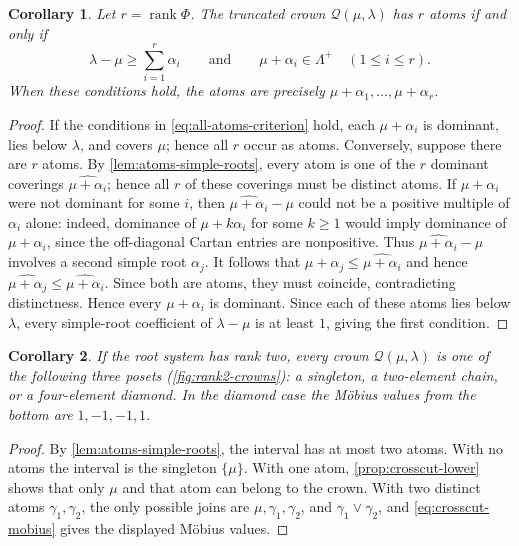 \documentclass[11pt]{article}
\newtheorem{corollary}[corollary]{Corollary}
\theoremstyle{definition}
\theoremstyle{remark}
\newcommand{\Raiz}{\Phi}
\newcommand{\Pesos}{\Lambda}
\newcommand{\QO}{\mathscr{Q}}
\begin{document}
\begin{corollary}
\label{cor:all-simple-root-atoms}
Let $r=\operatorname{rank}\Raiz$.  The truncated crown
$\QO(\mu,\lambda)$ has $r$ atoms if and only if
\begin{equation}\label{eq:all-atoms-criterion}
      \lambda-\mu\ge\sum_{i=1}^{r}\alpha_i
      \qquad\text{and}\qquad
      \mu+\alpha_i\in\Pesos^+
      \quad(1\le i\le r).
\end{equation}
When these conditions hold, the atoms are precisely
$\mu+\alpha_1,\ldots,\mu+\alpha_r$.
\end{corollary}

\begin{proof}
If the conditions in \eqref{eq:all-atoms-criterion} hold, each
$\mu+\alpha_i$ is dominant, lies below $\lambda$, and covers $\mu$; hence all
$r$ occur as atoms.  Conversely, suppose there are $r$ atoms.  By
\cref{lem:atoms-simple-roots}, every atom is one of the $r$ dominant coverings
$\widehat{\mu+\alpha_i}$; hence all $r$ of these coverings must be distinct
atoms.  If $\mu+\alpha_i$ were not dominant for some $i$, then
$\widehat{\mu+\alpha_i}-\mu$ could not be a positive multiple of
$\alpha_i$ alone: indeed, dominance of $\mu+k\alpha_i$ for some $k\ge1$
would imply dominance of $\mu+\alpha_i$, since the off-diagonal Cartan
entries are nonpositive.  Thus
$\widehat{\mu+\alpha_i}-\mu$ involves a second simple root $\alpha_j$.
It follows that
$\mu+\alpha_j\le\widehat{\mu+\alpha_i}$ and hence
$\widehat{\mu+\alpha_j}\le\widehat{\mu+\alpha_i}$.  Since both are
atoms, they must coincide, contradicting distinctness.  Hence every
$\mu+\alpha_i$ is dominant.  Since each of these atoms lies below $\lambda$,
every simple-root coefficient of $\lambda-\mu$ is at least $1$, giving the
first condition.
\end{proof}

\begin{corollary}\label{cor:rank2-crowns}
If the root system has rank two, every crown $\QO(\mu,\lambda)$ is one of the
following three posets (\cref{fig:rank2-crowns}): a singleton, a two-element
chain, or a four-element diamond.  In the diamond case the M\"obius values from the bottom are
$1,-1,-1,1$.
\end{corollary}

\begin{proof}
By \cref{lem:atoms-simple-roots}, the interval has at most two atoms.  With no
atoms the interval is the singleton $\{\mu\}$.  With one atom,
\cref{prop:crosscut-lower} shows that only $\mu$ and that atom can belong to
the crown.  With two
distinct atoms $\gamma_1,\gamma_2$, the only possible joins are
$\mu,\gamma_1,\gamma_2$, and $\gamma_1\vee\gamma_2$, and
\eqref{eq:crosscut-mobius} gives the displayed M\"obius values.
\end{proof}
\end{document}

